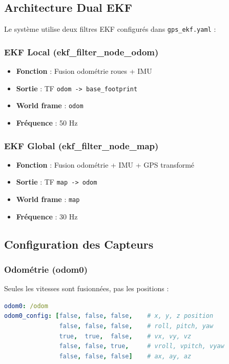 \documentclass[a4paper,12pt]{article}
\begin{document}
\subsection{Architecture Dual EKF}

Le système utilise deux filtres EKF configurés dans \texttt{gps\_ekf.yaml} :

\subsubsection{EKF Local (ekf\_filter\_node\_odom)}
\begin{itemize}
    \item \textbf{Fonction} : Fusion odométrie roues + IMU
    \item \textbf{Sortie} : TF \texttt{odom -> base\_footprint}
    \item \textbf{World frame} : \texttt{odom}
    \item \textbf{Fréquence} : 50 Hz
\end{itemize}

\subsubsection{EKF Global (ekf\_filter\_node\_map)}
\begin{itemize}
    \item \textbf{Fonction} : Fusion odométrie + IMU + GPS transformé
    \item \textbf{Sortie} : TF \texttt{map -> odom}
    \item \textbf{World frame} : \texttt{map}
    \item \textbf{Fréquence} : 30 Hz
\end{itemize}

\subsection{Configuration des Capteurs}

\subsubsection{Odométrie (odom0)}
Seules les vitesses sont fusionnées, pas les positions :

\begin{lstlisting}[language=YAML, caption=Configuration Odométrie]
odom0: /odom
odom0_config: [false, false, false,    # x, y, z position
               false, false, false,    # roll, pitch, yaw
               true,  true,  false,    # vx, vy, vz
               false, false, true,     # vroll, vpitch, vyaw
               false, false, false]    # ax, ay, az
\end{lstlisting}
\end{document}
